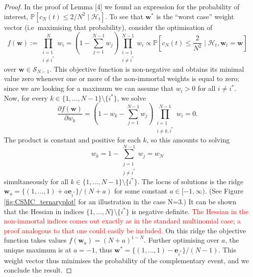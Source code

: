 \documentclass{article}
\newcommand{\seb}[1]{\xspace\textcolor{red}{#1}\xspace}
\newcommand{\PR}{\mathbb{P}}
\begin{document}
\begin{proof}
In the proof of Lemma [4] we found an expression for the probability of interest, $\PR[c_N(t) \leq 2/N^2 \mid \mathcal{H}_t]$.
To see that $\mathbf{w}^*$ is the ``worst case'' weight vector (i.e\ maximising that probability), consider the optimisation of
\begin{equation*}
f(\mathbf{w}) :=
\prod_{\substack{i=1\\ i\neq i^*}}^N w_i
= \left(1- \sum_{j=1}^{N-1} w_j \right)\prod_{\substack{i=1\\ i\neq i^*}}^{N-1} w_i 
\propto \PR \left[c_N(t) \leq \frac{2}{N^2} \mid \mathcal{H}_t, \mathbf{w}_t = \mathbf{w} \right]
\end{equation*}
over $\mathbf{w} \in \mathcal{S}_{N-1}$.
This objective function is non-negative and obtains its minimal value zero whenever one or more of the non-immortal weights is equal to zero; since we are looking for a maximum we can assume that $w_i >0$ for all $i \neq i^*$.
Now, for every $k \in \{1,\dots,N-1\}\setminus \{i^*\}$, we solve
\begin{equation*}
\frac{\partial f(\mathbf{w})}{\partial w_k}
= \left(1- w_k - \sum_{j=1}^{N-1} w_j \right)\prod_{\substack{i=1\\ i\neq k,i^*}}^{N-1} w_i 
=0 .
\end{equation*}
The product is constant and positive for each $k$, so this amounts to solving
\begin{equation*}
w_k = 1- \sum_{\substack{j=1\\ j\neq i^*}}^{N-1} w_j = w_N
\end{equation*}
simultaneously for all $k \in \{1,\dots,N-1\}\setminus \{i^*\}$.
The locus of solutions is the ridge
$\mathbf{w}_a = \{(1, \dots,1) +a \mathbf{e}_{i^*} \} /(N+a)$ for some constant $a \in [-1,\infty)$. (See Figure \ref{fig:CSMC_ternaryplot} for an illustration in the case N=3.)
It can be shown that the Hessian in indices $\{1,\dots,N\}\setminus \{i^*\}$ is negative definite.
\seb{The Hessian in the non-immortal indices comes out exactly as in the standard multinomial case; a proof analogous to that one could easily be included.}
On this ridge the objective function takes values $f(\mathbf{w}_a) = (N+a)^{1-N}$.
Further optimising over $a$, the unique maximum is at $a=-1$, thus $\mathbf{w}^* = \{(1,\dots,1) - \mathbf{e}_{i^*}\} /(N-1)$.
This weight vector thus minimises the probability of the complementary event, and we conclude the result.
\end{proof}
\end{document}
